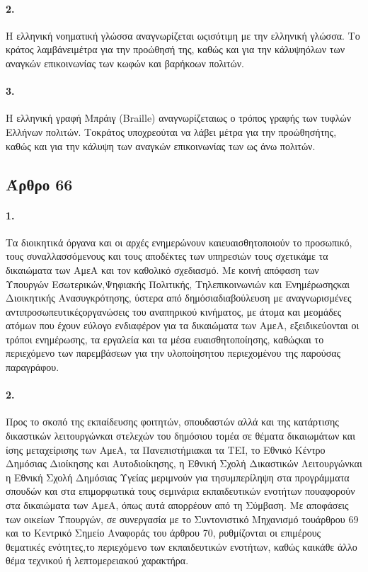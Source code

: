 \documentclass[a4paper,oneside, 10pt]{book}
\begin{document}
\paragraph { 2. } Η ελληνική νοηματική γλώσσα αναγνωρίζεται ωςισότιμη με την ελληνική γλώσσα. Το κράτος λαμβάνειμέτρα για την προώθησή της, καθώς και για την κάλυψηόλων των αναγκών επικοινωνίας των κωφών και βαρήκοων πολιτών.
\paragraph { 3. } Η ελληνική γραφή Μπράιγ (Braille) αναγνωρίζεταιως ο τρόπος γραφής των τυφλών Ελλήνων πολιτών. Τοκράτος υποχρεούται να λάβει μέτρα για την προώθησήτης, καθώς και για την κάλυψη των αναγκών επικοινωνίας των ως άνω πολιτών.
\subsection*{ Άρθρο 66 }
\paragraph { 1. } Τα διοικητικά όργανα και οι αρχές ενημερώνουν καιευαισθητοποιούν το προσωπικό, τους συναλλασσόμενους και τους αποδέκτες των υπηρεσιών τους σχετικάμε τα δικαιώματα των ΑμεΑ και τον καθολικό σχεδιασμό. Με κοινή απόφαση των Υπουργών Εσωτερικών,Ψηφιακής Πολιτικής, Τηλεπικοινωνιών και Ενημέρωσηςκαι Διοικητικής Ανασυγκρότησης, ύστερα από δημόσιαδιαβούλευση με αναγνωρισμένες αντιπροσωπευτικέςοργανώσεις του αναπηρικού κινήματος, με άτομα και μεομάδες ατόμων που έχουν εύλογο ενδιαφέρον για τα δικαιώματα των ΑμεΑ, εξειδικεύονται οι τρόποι ενημέρωσης, τα εργαλεία και τα μέσα ευαισθητοποίησης, καθώςκαι το περιεχόμενο των παρεμβάσεων για την υλοποίησητου περιεχομένου της παρούσας παραγράφου.
\paragraph { 2. } Προς το σκοπό της εκπαίδευσης φοιτητών, σπουδαστών αλλά και της κατάρτισης δικαστικών λειτουργώνκαι στελεχών του δημόσιου τομέα σε θέματα δικαιωμάτων και ίσης μεταχείρισης των ΑμεΑ, τα Πανεπιστήμιακαι τα ΤΕΙ, το Εθνικό Κέντρο Δημόσιας Διοίκησης και Αυτοδιοίκησης, η Εθνική Σχολή Δικαστικών Λειτουργώνκαι η Εθνική Σχολή Δημόσιας Υγείας μεριμνούν για τησυμπερίληψη στα προγράμματα σπουδών και στα επιμορφωτικά τους σεμινάρια εκπαιδευτικών ενοτήτων πουαφορούν στα δικαιώματα των ΑμεΑ, όπως αυτά απορρέουν από τη Σύμβαση. Με αποφάσεις των οικείων Υπουργών, σε συνεργασία με το Συντονιστικό Μηχανισμό τουάρθρου 69 και το Κεντρικό Σημείο Αναφοράς του άρθρου 70, ρυθμίζονται οι επιμέρους θεματικές ενότητες,το περιεχόμενο των εκπαιδευτικών ενοτήτων, καθώς καικάθε άλλο θέμα τεχνικού ή λεπτομερειακού χαρακτήρα.
\end{document}
